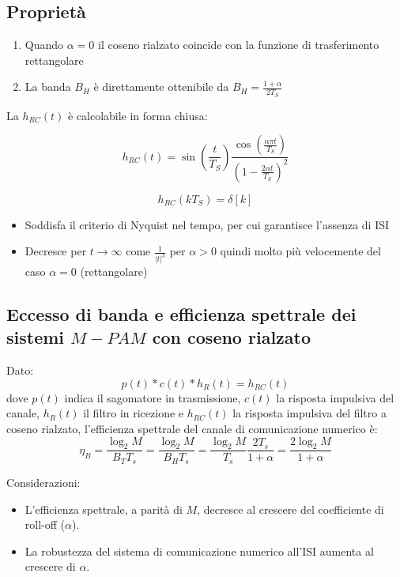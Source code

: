 \subsection*{Propriet\`a}
\begin{enumerate}
    \item Quando \( \alpha = 0 \) il coseno rialzato coincide con la funzione di trasferimento rettangolare
    \item La banda \( B_H \) \`e direttamente ottenibile da \( B_H = \frac{1+\alpha}{2T_S} \)
\end{enumerate}

La \( h_{RC}(t) \) \`e calcolabile in forma chiusa:

\[ h_{RC}(t) = \sin\left(\frac{t}{T_S}\right) \frac{\cos\left(\frac{\alpha \pi t}{T_S}\right)}{\left(1- \frac{2\alpha t}{T_S}\right)^2}  \]

\[ h_{RC}(kT_S) = \delta[k] \]

\begin{itemize}
    \item Soddisfa il criterio di Nyquist nel tempo, per cui garantisce l'assenza di ISI
    \item Decresce per \( t \rightarrow \infty \) come \( \frac{1}{|t|^3} \) per \( \alpha > 0 \) quindi molto pi\`u velocemente del caso \( \alpha = 0 \) (rettangolare)
\end{itemize}




\subsection*{Eccesso di banda e efficienza spettrale dei sistemi \( M-PAM \) con coseno rialzato}

Dato:
\[ p(t) \ast c(t) \ast h_R(t) = h_{RC}(t) \]
dove $p(t)$ indica il sagomatore in trasmissione, $c(t)$ la risposta impulsiva del canale, $h_R(t)$ il filtro in ricezione e \( h_{RC}(t) \) la risposta impulsiva del filtro a coseno rialzato, l'efficienza spettrale del canale di comunicazione numerico è:
\[ \eta_{B} = \frac{\log_2M}{B_T T_s} = \frac{\log_2M}{B_H T_s} = \frac{\log_2M}{ T_s} \frac{2T_s}{1+\alpha} = \frac{2\log_2M}{1+\alpha}\]

Considerazioni:
\begin{itemize}
    \item L'efficienza spettrale, a parità di \( M \), decresce al crescere del coefficiente di roll-off (\( \alpha \)).
    \item La robustezza del sistema di comunicazione numerico all'ISI aumenta al crescere di \( \alpha \).
\end{itemize}

